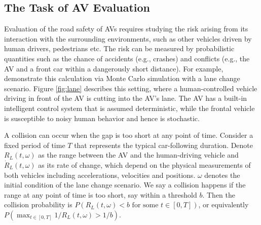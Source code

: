 \documentclass{wscpaperproc}
\theoremstyle{wsc}
\begin{document}
\subsection{The Task of AV Evaluation}\label{sec:task}
Evaluation of the road safety of AVs requires studying the risk arising from its interaction with the surrounding environments, such as other vehicles driven by human drivers, pedestrians etc. The risk can be measured by probabilistic quantities such as the chance of accidents (e.g., crashes) and conflicts (e.g., the AV and a front car within a dangerously short distance). For example,  demonstrate this calculation via Monte Carlo simulation with a lane change scenario. Figure \ref{fig:lane} describes this setting, where a human-controlled vehicle driving in front of the AV is cutting into the AV's lane. The AV has a built-in intelligent control system that is assumed deterministic, while the frontal vehicle is susceptible to noisy human behavior and hence is stochastic. 

A collision can occur when the gap is too short at any point of time. Consider a fixed period of time $T$ that represents the typical car-following duration. Denote $R_L(t,\omega)$ as the range between the AV and the human-driving vehicle and $\dot{R}_L(t,\omega)$ as its rate of change, which depend on the physical measurements of both vehicles including accelerations, velocities and positions. $\omega$ denotes the initial condition of the lane change scenario. We say a collision happens if the range at any point of time is too short, say within a threshold $b$. Then the collision probability is $P(R_L(t,\omega)<b\text{\ for some\ }t\in[0,T])$, or equivalently $P(\max_{t\in[0,T]}1/R_L(t,\omega)>1/b)$. 
\end{document}
